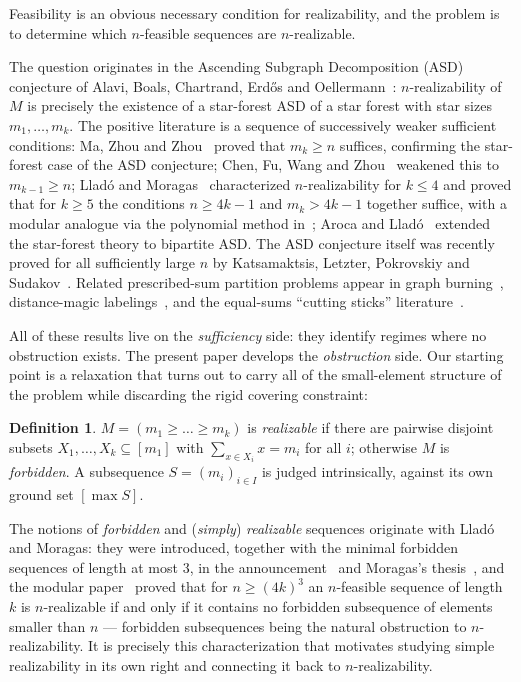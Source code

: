 \documentclass[11pt]{article}
\theoremstyle{definition}
\newtheorem{definition}[theorem]{Definition}
\theoremstyle{remark}
\newcommand{\intv}[1]{[#1]}
\begin{document}
Feasibility is an obvious necessary condition for realizability, and the problem
is to determine which $n$-feasible sequences are $n$-realizable.

The question originates in the Ascending Subgraph Decomposition (ASD) conjecture of
Alavi, Boals, Chartrand, Erd\H{o}s and Oellermann~\cite{AlaviBCEO87}: $n$-realizability
of $M$ is precisely the existence of a star-forest ASD of a star forest with star
sizes $m_1,\dots,m_k$. The positive literature is a sequence of successively weaker
sufficient conditions: Ma, Zhou and Zhou~\cite{MaZhouZhou94} proved that $m_k\ge n$
suffices, confirming the star-forest case of the ASD conjecture; Chen, Fu, Wang and
Zhou~\cite{ChenFuWangZhou05} weakened this to $m_{k-1}\ge n$; Lladó and
Moragas~\cite{LladoMoragas09} characterized $n$-realizability for $k\le 4$ and proved
that for $k\ge5$ the conditions $n\ge 4k-1$ and $m_k>4k-1$ together suffice, with a
modular analogue via the polynomial
method in~\cite{LladoMoragas12}; Aroca and Lladó~\cite{ArocaLlado18} extended the
star-forest theory to bipartite ASD. The ASD conjecture itself was recently proved for
all sufficiently large $n$ by Katsamaktsis, Letzter, Pokrovskiy and
Sudakov~\cite{KLPS25}. Related prescribed-sum partition problems appear in graph
burning~\cite{TanTeh24}, distance-magic labelings~\cite{CichaczGorlich18}, and the
equal-sums ``cutting sticks'' literature~\cite{BuchelGW18,HooryKotlar26}.

All of these results live on the \emph{sufficiency} side: they identify regimes where
no obstruction exists. The present paper develops the \emph{obstruction} side. Our
starting point is a relaxation that turns out to carry all of the small-element
structure of the problem while discarding the rigid covering constraint:

\begin{definition}\label{def:realizable}
$M=(m_1\ge\dots\ge m_k)$ is \emph{realizable} if there are pairwise disjoint subsets
$X_1,\dots,X_k\subseteq \intv{m_1}$ with $\sum_{x\in X_i}x=m_i$ for all $i$; otherwise
$M$ is \emph{forbidden}. A subsequence $S=(m_i)_{i\in I}$ is judged intrinsically,
against its own ground set $\intv{\max S}$.
\end{definition}

The notions of \emph{forbidden} and (\emph{simply}) \emph{realizable} sequences
originate with Lladó and Moragas: they were introduced, together with the minimal
forbidden sequences of length at most $3$, in the announcement~\cite{LladoMoragas09}
and Moragas's thesis~\cite[\S4.2.1]{Moragas10}, and the modular
paper~\cite{LladoMoragas12} proved that for $n\ge(4k)^3$ an $n$-feasible sequence
of length $k$ is $n$-realizable if and only if it contains no forbidden subsequence of
elements smaller than $n$ --- forbidden subsequences being the natural obstruction to
$n$-realizability. It is precisely this characterization that motivates studying
simple realizability in its own right and connecting it back to $n$-realizability.
\end{document}
